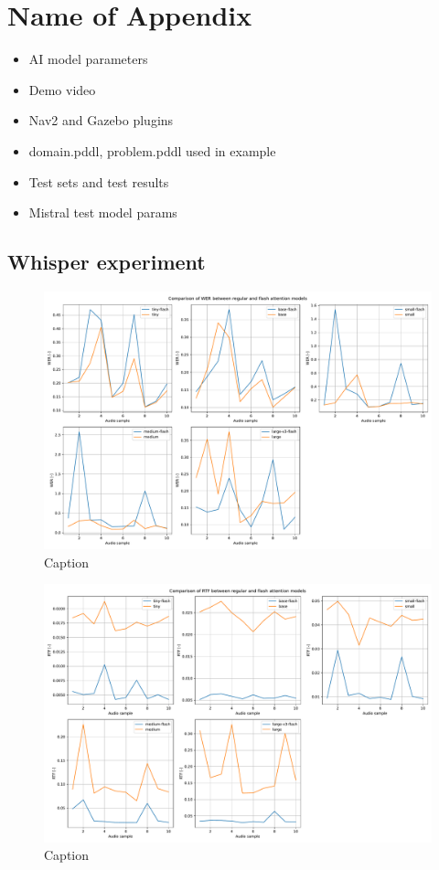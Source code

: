 \chapter{Name of Appendix}

\begin{itemize}
    \item AI model parameters
    \item Demo video
    \item Nav2 and Gazebo plugins
    \item domain.pddl, problem.pddl used in example
    \item Test sets and test results
    \item Mistral test model params
\end{itemize}

\section{Whisper experiment}

\begin{figure}
    \centering
    \includegraphics[width=\textwidth]{figures/wer.pdf}
    \caption{Caption}
    \label{fig:whisper_wer}
\end{figure}

\begin{figure}
    \centering
    \includegraphics[width=\textwidth]{figures/rtf.pdf}
    \caption{Caption}
    \label{fig:whisper_rtf}
\end{figure}

